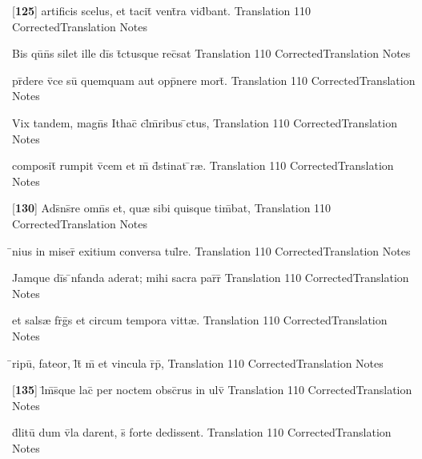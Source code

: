 \latline
  {[\textbf{125}] artificis scelus, et tacit\={\macron {\i}} vent\={}ra vid\={}bant.}
  { Translation }
  {110}
  { CorrectedTranslation }
  { Notes }


\latline
  {Bis qu\={\macron {\i}}n\={}s silet ille di\={}s t\={}ctusque rec\={}sat}
  { Translation }
  {110}
  { CorrectedTranslation }
  { Notes }


\latline
  {pr\={}dere v\={}ce su\={} quemquam aut opp\={}nere mort\={\macron {\i}}.}
  { Translation }
  {110}
  { CorrectedTranslation }
  { Notes }


\latline
  {Vix tandem, magn\={\macron {\i}}s Ithac\={\macron {\i}} cl\={}m\={}ribus \={}ctus,}
  { Translation }
  {110}
  { CorrectedTranslation }
  { Notes }


\latline
  {composit\={} rumpit v\={}cem et m\={} d\={}stinat \={}r{\ae}.}
  { Translation }
  {110}
  { CorrectedTranslation }
  { Notes }


\latline
  {[\textbf{130}] Ads\={}ns\={}re omn\={}s et, qu{\ae} sibi quisque tim\={}bat,}
  { Translation }
  {110}
  { CorrectedTranslation }
  { Notes }


\latline
  {\={}nius in miser\={\macron {\i}} exitium conversa tul\={}re.}
  { Translation }
  {110}
  { CorrectedTranslation }
  { Notes }


\latline
  {Jamque di\={}s \={\macron {\i}}nfanda aderat; mihi sacra par\={}r\={\macron {\i}} }
  { Translation }
  {110}
  { CorrectedTranslation }
  { Notes }


\latline
  {et sals{\ae} fr\={}g\={}s et circum tempora vitt{\ae}.}
  { Translation }
  {110}
  { CorrectedTranslation }
  { Notes }


\latline
  {\={}ripu\={\macron {\i}}, fateor, l\={}t\={} m\={} et vincula r\={}p\={\macron {\i}},}
  { Translation }
  {110}
  { CorrectedTranslation }
  { Notes }


\latline
  {[\textbf{135}] l\={\macron {\i}}m\={}s\={}que lac\={} per noctem obsc\={}rus in ulv\={}}
  { Translation }
  {110}
  { CorrectedTranslation }
  { Notes }


\latline
  {d\={}litu\={\macron {\i}} dum v\={}la darent, s\={\macron {\i}} forte dedissent.}
  { Translation }
  {110}
  { CorrectedTranslation }
  { Notes }


